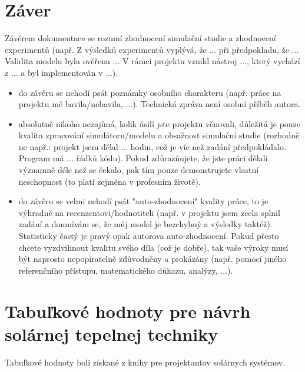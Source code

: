 \documentclass[a4paper, 11pt]{article}
\begin{document}
\section{Záver}
{\color{red}Závěrem dokumentace se rozumí zhodnocení simulační studie a zhodnocení experimentů (např. Z výsledků experimentů vyplývá, že ... při předpokladu, že ... Validita modelu byla ověřena ... V rámci projektu vznikl nástroj ..., který vychází z ... a byl implementován v ...).
\begin{itemize}
	\item do závěru se nehodí psát poznámky osobního charakteru (např. práce na projektu mě bavila/nebavila, ...). Technická zpráva není osobní příběh autora.
	\item absolutně nikoho nezajímá, kolik úsilí jste projektu věnovali, důležitá je pouze kvalita zpracování simulátoru/modelu a obsažnost simulační studie (rozhodně ne např.: projekt jsem dělal ... hodin, což je víc než zadání předpokládalo. Program má ... řádků kódu). Pokud zdůrazňujete, že jste práci dělali významně déle než se čekalo, pak tím pouze demonstrujete vlastní neschopnost (to platí zejména v profesním životě).
	\item do závěru se velmi nehodí psát "auto-zhodnocení" kvality práce, to je výhradně na recenzentovi/hodnotiteli (např. v projektu jsem zcela splnil zadání a domnívám se, že můj model je bezchybný a výsledky taktéž). Statisticky častý je pravý opak autorova auto-zhodnocení. Pokud přesto chcete vyzdvihnout kvalitu svého díla (což je dobře), tak vaše výroky musí být naprosto nepopiratelně zdůvodněny a prokázány (např. pomocí jiného referenčního přístupu, matematického důkazu, analýzy, ...).
\end{itemize}
}

\newpage



\newpage
\appendix

\section{Tabuľkové hodnoty pre návrh solárnej tepelnej techniky}\label{tabulky}

Tabuľkové hodnoty boli získané z knihy pre projektantov solárnych systémov\cite{Cihelka}.
\end{document}
